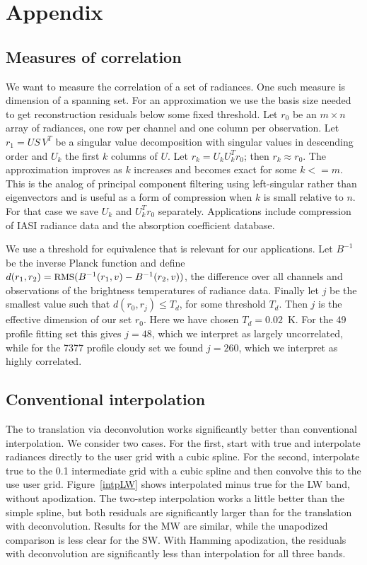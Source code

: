 \documentclass[10pt,twocolumn]{article}
\begin{document}
\section{Appendix}
\label{append}

\subsection{Measures of correlation}

We want to measure the correlation of a set of radiances.  One such
measure is dimension of a spanning set.  For an approximation we use
the basis size needed to get reconstruction residuals below some
fixed threshold.  Let $r_0$ be an $m \times n$ array of radiances,
one row per channel and one column per observation.  Let $r_1 = U
S\,V^T$ be a singular value decomposition with singular values in
descending order and $U_k$ the first $k$ columns of $U$.  Let $r_k =
U_k U_k^T r_0$; then $r_k \approx r_0$.  The approximation improves
as $k$ increases and becomes exact for some $k <= m$.  This is the
analog of principal component filtering using left-singular rather
than eigenvectors and is useful as a form of compression when $k$ is
small relative to $n$.  For that case we save $U_k$ and $U_k^T r_0$
separately.  Applications include compression of IASI radiance data
and the {\kcarta} absorption coefficient database.

We use a threshold for equivalence that is relevant for our
applications.  Let $B^{-1}$ be the inverse Planck function and
define $d(r_1, r_2) = \mbox{\small RMS}(B^{-1}(r_1, v) - B^{-1}(r_2, v))$, the
{\rms} difference over all channels and observations of the
brightness temperatures of radiance data.  Finally let $j$ be the
smallest value such that $d(r_0, r_j) \le T_d$, for some threshold
$T_d$.  Then $j$ is the effective dimension of our set $r_0$.  Here
we have chosen $T_d = 0.02$~K.  For the 49 profile fitting set this
gives $j=48$, which we interpret as largely uncorrelated, while for
the 7377 profile cloudy set we found $j=260$, which we interpret as
highly correlated.

\subsection{Conventional interpolation}

The {\airs} to {\cris} translation via deconvolution works
significantly better than conventional interpolation.  We consider
two cases.  For the first, start with true {\airs} and interpolate
radiances directly to the {\cris} user grid with a cubic spline.
For the second, interpolate true {\airs} to the 0.1 {\wn}
intermediate grid with a cubic spline and then convolve this to the
use {\cris} user grid.  Figure~\ref{intpLW} shows interpolated
{\cris} minus true {\cris} for the LW band, without apodization.
The two-step interpolation works a little better than the simple
spline, but both residuals are significantly larger than for the
translation with deconvolution.  Results for the MW are similar,
while the unapodized comparison is less clear for the SW.  With
Hamming apodization, the residuals with deconvolution are
significantly less than interpolation for all three bands.
\end{document}
